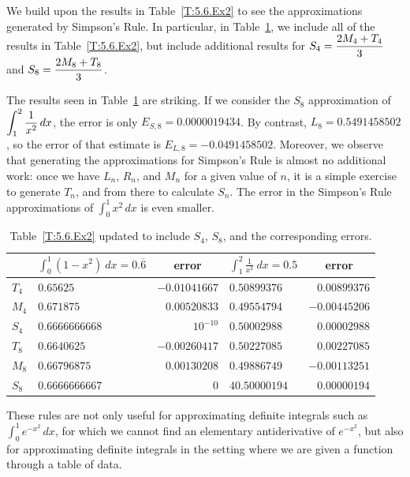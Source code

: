 We build upon the results in Table~\ref{T:5.6.Ex2} to see the approximations generated by Simpson's Rule.  In particular, in Table~\ref{T:5.6.Ex3}, we include all of the results in Table~\ref{T:5.6.Ex2}, but include additional results for $\displaystyle S_4 = \frac{2M_4 + T_4}{3}$ and $\displaystyle S_8 = \frac{2M_8 + T_8}{3}$.

The results seen in Table~\ref{T:5.6.Ex3} are striking.  If we consider the $S_8$ approximation of $\displaystyle\int_1^2 \frac{1}{x^2} \, dx$, the error is only $E_{S,8} = 0.0000019434$.  By contrast, $L_8 = 0.5491458502$, so the error of that estimate is $E_{L,8} = -0.0491458502$.  Moreover, we observe that generating the approximations for Simpson's Rule is almost no additional work:  once we have $L_n$, $R_n$, and $M_n$ for a given value of $n$, it is a simple exercise to generate $T_n$, and from there to calculate $S_n$.  The error in the Simpson's Rule approximations of $\int_0^1 x^2 \, dx$ is even smaller.

\begin{table}[h]\small
\begin{center}
\begin{tabularx}{\textwidth}{|X|l|r||l|r|}
\hline
\T \ & $\int_0^1 (1-x^2) \ dx = 0.\overline{6} $ & \multicolumn{1}{c||}{error} & $\int_1^2 \frac{1}{x^2} \ dx = 0.5$ & \multicolumn{1}{c|}{error} \B \\
\hline \hline
\T $T_4$ & $0.65625$ & $-0.01041667$ & $0.50899376$ & $0.00899376$ \B \\
\hline
\T $M_4$ & $0.671875$ & $0.00520833$ & $0.49554794$ & $-0.00445206$ \B \\
\hline
\T $S_4$ & $0.6666666668$ & $10^{-10}$ & $0.50002988$ & $0.00002988$ \B \\
\hline
\T $T_8$ & $0.6640625$ & $-0.00260417$ & $0.50227085$ & $0.00227085$ \B \\
\hline
\T $M_8$ & $0.66796875$ & $0.00130208$ & $0.49886749$ & $-0.00113251$ \B \\
\hline
\T $S_8$ & $0.6666666667$ &  $0$ & $40.50000194$ & $0.00000194$ \B \\
\hline
\end{tabularx} 
\end{center}
\caption{Table~\ref{T:5.6.Ex2} updated to include $S_4$, $S_8$, and the corresponding errors.} \label{T:5.6.Ex3}
\end{table}\normalsize


These rules are not only useful for approximating definite integrals such as $\int_0^1 e^{-x^2} \, dx$, for which we cannot find an elementary antiderivative of $e^{-x^2}$, but also for approximating definite integrals in the setting where we are given a function through a table of data.

